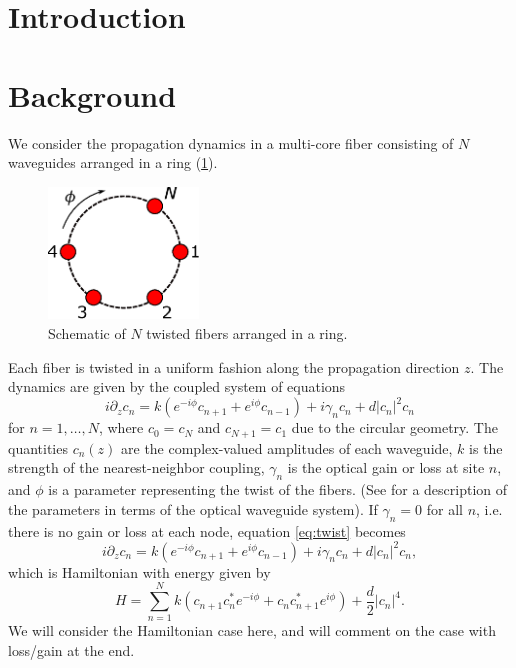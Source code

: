 \documentclass[12pt]{article}
\begin{document}
\section{Introduction}


\section{Background}

We consider the propagation dynamics in a multi-core fiber consisting of $N$ waveguides arranged in a ring (\cref{fig:ring}).
\begin{figure}[H]
\begin{center}
\includegraphics[width=4cm]{circle.eps}
\end{center}
\caption{Schematic of $N$ twisted fibers arranged in a ring.}
\label{fig:ring}
\end{figure}
Each fiber is twisted in a uniform fashion along the propagation direction $z$. The dynamics are given by the coupled system of equations
\begin{equation}\label{eq:twist}
i \partial_z c_n = k \left(e^{-i\phi}c_{n+1} + e^{i\phi}c_{n-1}\right) + i \gamma_n c_n + d |c_n|^2 c_n 
\end{equation}
for $n = 1, \dots, N$, where $c_0 = c_{N}$ and $c_{N+1} = c_1$ due to the circular geometry. The quantities $c_n(z)$ are the complex-valued amplitudes of each waveguide, $k$ is the strength of the nearest-neighbor coupling, $\gamma_n$ is the optical gain or loss at site $n$, and $\phi$ is a parameter representing the twist of the fibers. (See \cite[(2.1)]{castro2016} for a description of the parameters in terms of the optical waveguide system). If $\gamma_n = 0$ for all $n$, i.e. there is no gain or loss at each node, equation \cref{eq:twist} becomes
\begin{equation}\label{eq:twist1}
i \partial_z c_n = k \left(e^{-i\phi}c_{n+1} + e^{i\phi}c_{n-1}\right) + i \gamma_n c_n + d |c_n|^2 c_n,
\end{equation}
which is Hamiltonian with energy given by
\begin{equation}
H = \sum_{n=1}^N k (c_{n+1}c_n^* e^{-i \phi} + c_n c_{n+1}^* e^{i \phi}) + \frac{d}{2}|c_n|^4.
\end{equation}
We will consider the Hamiltonian case here, and will comment on the case with loss/gain at the end.
\end{document}
